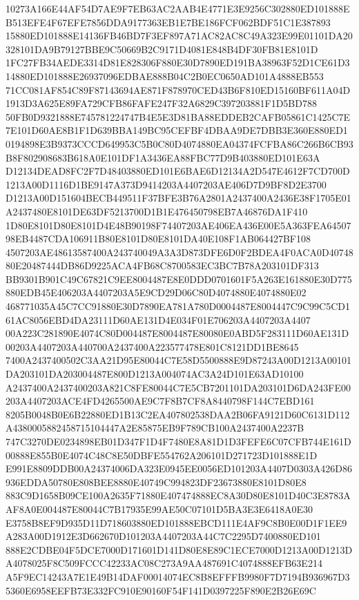 \documentclass[UTF8,fontset=fandol,zihao=-4,a4paper]{ctexart}
\begin{document}
{{10273A166E44AF54D7AE9F7EB63AC2AAB4E4771E3E9256C302880ED101888EB513EFE4F67EFE7856DDA9177363EB1E7BE186FCF062BDF51C1E387893
15880ED101888E14136FB46BD7F3EF897A71AC82AC8C49A323E99E01101DA20328101DA9B79127BBE9C50669B2C9171D4081E848B4DF30FB81E8101D
1FC27FB34AEDE3314D81E828306F880E30D7890ED191BA38963F52D1CE61D314880ED101888E26937096EDBAE888B04C2B0EC0650AD101A4888EB553
71CC081AF854C89F87143694AE871F878970CED43B6F810ED15160BF611A04D1913D3A625E89FA729CFB86FAFE247F32A6829C397203881F1D5BD788
50FB0D9321888E745781224747B4E5E3D81BA88EDDEB2CAFB05861C1425C7E7E101D60AE8B1F1D639BBA149BC95CEFBF4DBAA9DE7DBB3E360E880ED1
0194898E3B9373CCCD649953C5B0C80D4074880EA04374FCFBA86C266B6CB93B8F802908683B618A0E101DF1A3436EA88FBC77D9B403880ED101E63A
D12134DEAD8FC2F7D48403880ED101E6BAE6D12134A2D547E4612F7CD700D1213A00D1116D1BE9147A373D9414203A4407203AE406D7D9BF8D2E3700
D1213A00D151604BECB449511F37BFE3B76A2801A2437400A2436E38F1705E01A2437480E8101DE63DF5213700D1B1E476450798EB7A46876DA1F410
1D80E8101D80E8101D4E48B90198F74407203AE406EA436E00E5A363FEA6450798EB4487CDA106911B80E8101D80E8101DA40E108F1AB064427BF108
4507203AE48613587400A243740049A3A3D873DFE6D0F2BDEA4F0ACA0D4074880E20487444DB86D9225ACA4FB68C8700583EC3BC7B78A203101DF313
BB9301B901C49C67821C9EE8004487E8E0DDD0701601F5A263E161880E30D775880EDB45E406203A4407203A5E9CD29D06C80D4074880E4074880E02
468771035A45C7CC91880E30D7890EA781A780D0004487E8004447C9C99C5CD161AC8056EBD4DA23111D60AE131D4E034F01E706203A4407203A4407
00A223C281890E4074C80D004487E8004487E80080E0ABD5F283111D60AE131D00203A4407203A440700A2437400A223577478E801C8121DD1BE8645
7400A2437400502C3AA21D95E80044C7E58D5500888E9D87243A00D1213A00101DA203101DA203004487E800D1213A004074AC3A24D101E63AD10100
A2437400A2437400203A821C8FE80044C7E5CB7201101DA203101D6DA243FE00203A4407203ACE4FD4265500AE9C7F8B7CF8A8440798F144C7EBD161
8205B0048B0E6B22880ED1B13C2EA407802538DAA2B06FA9121D60C6131D112A4380005882458715104447A2E85875EB9F789CB100A2437400A2237B
747C3270DE0234898EB01D347F1D4F7480E8A81D1D3FEFE6C07CFB744E161D00888E855B0E4074C48C8E50DBFE554762A206101D271723D101888E1D
E991E8809DDB00A24374006DA323E0945EE0056ED101203A4407D0303A426D86936EDDA50780E808BEE8880E40749C994823DF23673880E8101D80E8
883C9D1658B09CE100A2635F71880E407474888EC8A30D80E8101D40C3E8783AAF8A0E004487E80044C7B17935E99AE50C07101D5BA3E3E6418A0E30
E3758B8EF9D935D11D718603880ED101888EBCD111E4AF9C8B0E00D1F1EE9A283A00D1912E3D662670D101203A4407203A44C7C2295D7400880ED101
888E2CDBE04F5DCE7000D171601D141D80E8E89C1ECE7000D1213A00D1213DA4078025F8C509FCCC42233AC08C273A9AA487691C4074888EFB63E214
A5F9EC14243A7E1E49B14DAF00014074EC8B8EFFFB9980F7D7194B936967D35360E6958EEFB73E332FC910E90160F54F141D0397225F890E2B26E69C
}}
\end{document}
